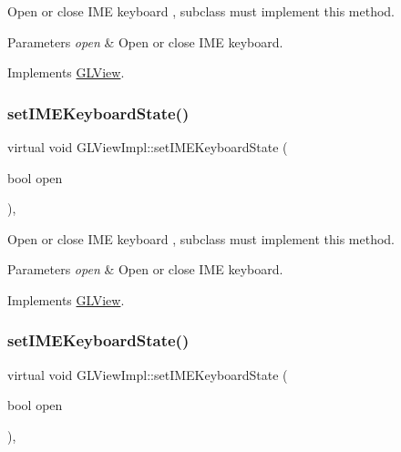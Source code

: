 Open or close I\+ME keyboard , subclass must implement this method.


\begin{DoxyParams}{Parameters}
{\em open} & Open or close I\+ME keyboard. \\
\hline
\end{DoxyParams}


Implements \hyperlink{classGLView_aaa70edad9dd4b2052237867db978e06d}{G\+L\+View}.

\mbox{\label{classGLViewImpl_a37e04acaf52f6258ebe98d6b36c3b6c3}} 
\subsubsection{\texorpdfstring{set\+I\+M\+E\+Keyboard\+State()}{setIMEKeyboardState()}\hspace{0.1cm}{\footnotesize\ttfamily [5/9]}}
{\footnotesize\ttfamily virtual void G\+L\+View\+Impl\+::set\+I\+M\+E\+Keyboard\+State (\begin{DoxyParamCaption}\item[{bool}]{open }\end{DoxyParamCaption})\hspace{0.3cm}{\ttfamily [override]}, {\ttfamily [virtual]}}

Open or close I\+ME keyboard , subclass must implement this method.


\begin{DoxyParams}{Parameters}
{\em open} & Open or close I\+ME keyboard. \\
\hline
\end{DoxyParams}


Implements \hyperlink{classGLView_aaa70edad9dd4b2052237867db978e06d}{G\+L\+View}.

\mbox{\label{classGLViewImpl_a37e04acaf52f6258ebe98d6b36c3b6c3}} 
\subsubsection{\texorpdfstring{set\+I\+M\+E\+Keyboard\+State()}{setIMEKeyboardState()}\hspace{0.1cm}{\footnotesize\ttfamily [6/9]}}
{\footnotesize\ttfamily virtual void G\+L\+View\+Impl\+::set\+I\+M\+E\+Keyboard\+State (\begin{DoxyParamCaption}\item[{bool}]{open }\end{DoxyParamCaption})\hspace{0.3cm}{\ttfamily [override]}, {\ttfamily [virtual]}}

